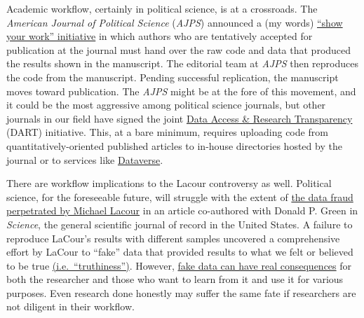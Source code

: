\documentclass[10pt,a4paper]{article}
\begin{document}
Academic workflow, certainly in political science, is at a crossroads.
The \emph{American Journal of Political Science} (\emph{AJPS}) announced
a (my words)
\href{http://ajps.org/2015/03/26/the-ajps-replication-policy-innovations-and-revisions/}{``show
your work'' initiative} in which authors who are tentatively accepted
for publication at the journal must hand over the raw code and data that
produced the results shown in the manuscript. The editorial team at
\emph{AJPS} then reproduces the code from the manuscript. Pending
successful replication, the manuscript moves toward publication. The
\emph{AJPS} might be at the fore of this movement, and it could be the
most aggressive among political science journals, but other journals in
our field have signed the joint
\href{http://www.dartstatement.org/}{Data Access \& Research
Transparency} (DART) initiative. This, at a bare minimum, requires
uploading code from quantitatively-oriented published articles to
in-house directories hosted by the journal or to services like
\href{http://dataverse.org/}{Dataverse}.

There are workflow implications to the Lacour controversy as well.
Political science, for the foreseeable future, will struggle with the
extent of
\href{http://stanford.edu/~dbroock/broockman_kalla_aronow_lg_irregularities.pdf}{the
data fraud perpetrated by Michael Lacour} in an article co-authored with
Donald P. Green in \emph{Science}, the general scientific journal of
record in the United States. A failure to reproduce LaCour's results
with different samples uncovered a comprehensive effort by LaCour to
``fake'' data that provided results to what we felt or believed to be
true
\href{http://chronicle.com/article/LAffaire-LaCour/230905/}{(i.e.~``truthiness'')}.
However,
\href{http://kieranhealy.org/blog/archives/2015/05/20/fake-science-real-consequences/}{fake
data can have real consequences} for both the researcher and those who
want to learn from it and use it for various purposes. Even research
done honestly may suffer the same fate if researchers are not diligent
in their workflow.
\end{document}
